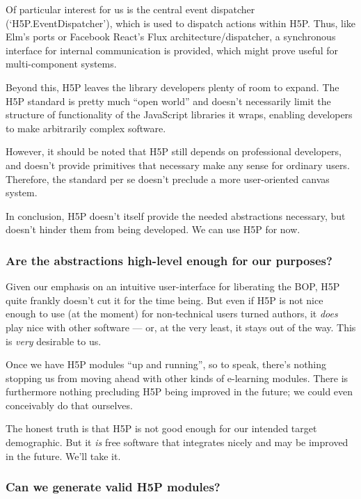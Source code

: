 Of particular interest for us is the central event dispatcher 
(`H5P.EventDispatcher'), which is used to dispatch actions within 
H5P\cite{h5pdispatch}. Thus, like Elm's ports\cite{elmports} or Facebook 
React's Flux architecture/dispatcher\cite{fluxdispatch}, a synchronous 
interface for internal communication is provided, which might prove useful for 
multi-component systems.

Beyond this, H5P leaves the library developers plenty of room to expand. The 
H5P standard is pretty much ``open world'' and doesn't necessarily limit the 
structure of functionality of the JavaScript libraries it wraps, enabling 
developers to make arbitrarily complex software.

However, it should be noted that H5P still depends on professional
developers, and doesn't provide primitives that necessary make any sense for
ordinary users. Therefore, the standard per se doesn't preclude a more
user-oriented canvas system.

In conclusion, H5P doesn't itself provide the needed abstractions necessary, but
doesn't hinder them from being developed. We can use H5P for now.

\subsubsection{Are the abstractions high-level enough for our purposes?}

Given our emphasis on an intuitive user-interface for liberating the BOP, H5P 
quite frankly doesn't cut it for the time being. But even if H5P is not nice 
enough to use (at the moment) for non-technical users turned authors, it 
\emph{does} play nice with other software --- or, at the very least, it stays 
out of the way. This is \emph{very} desirable to us.

Once we have H5P modules ``up and running'', so to speak, there's nothing 
stopping us from moving ahead with other kinds of e-learning modules. There is 
furthermore nothing precluding H5P being improved in the future; we could even 
conceivably do that ourselves.

The honest truth is that H5P is not good enough for our intended target 
demographic. But it \emph{is} free software that integrates nicely and may be 
improved in the future. We'll take it.

\subsubsection{Can we generate valid H5P modules?}

